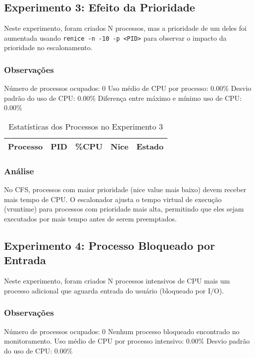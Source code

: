 \documentclass{article}
\begin{document}
\subsection{Experimento 3: Efeito da Prioridade}
Neste experimento, foram criados N processos, mas a prioridade de um deles foi aumentada 
usando \texttt{renice -n -10 -p <PID>} para observar o impacto da prioridade no escalonamento.

\subsubsection{Observações}

Número de processos ocupados: 0
Uso médio de CPU por processo: 0.00\%
Desvio padrão do uso de CPU: 0.00\%
Diferença entre máximo e mínimo uso de CPU: 0.00\%


\begin{table}[H]
\centering
\caption{Estatísticas dos Processos no Experimento 3}
\begin{tabular}{lrrrc}
\toprule
\textbf{Processo} & \textbf{PID} & \textbf{\%CPU} & \textbf{Nice} & \textbf{Estado} \\
\midrule
\bottomrule
\end{tabular}
\end{table}

\subsubsection{Análise}
No CFS, processos com maior prioridade (nice value mais baixo) devem receber mais tempo de CPU.
O escalonador ajusta o tempo virtual de execução (vruntime) para processos com prioridade mais alta,
permitindo que eles sejam executados por mais tempo antes de serem preemptados.
\subsection{Experimento 4: Processo Bloqueado por Entrada}
Neste experimento, foram criados N processos intensivos de CPU mais um processo adicional 
que aguarda entrada do usuário (bloqueado por I/O).

\subsubsection{Observações}

Número de processos ocupados: 0
Nenhum processo bloqueado encontrado no monitoramento.
Uso médio de CPU por processo intensivo: 0.00\%
Desvio padrão do uso de CPU: 0.00\%
\end{document}
